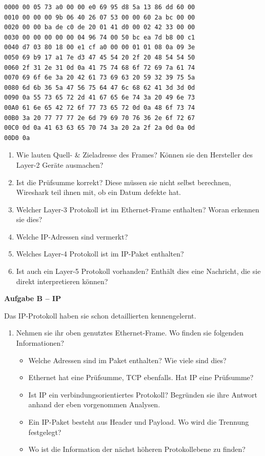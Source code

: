 \documentclass[paper=a4,fontsize=11pt]{scrartcl}%
\begin{document}
\begin{enumerate}
		\begin{lstlisting}[style=Bash, language=Bash]
0000 00 05 73 a0 00 00 e0 69 95 d8 5a 13 86 dd 60 00
0010 00 00 00 9b 06 40 26 07 53 00 00 60 2a bc 00 00
0020 00 00 ba de c0 de 20 01 41 d0 00 02 42 33 00 00
0030 00 00 00 00 00 04 96 74 00 50 bc ea 7d b8 00 c1
0040 d7 03 80 18 00 e1 cf a0 00 00 01 01 08 0a 09 3e
0050 69 b9 17 a1 7e d3 47 45 54 20 2f 20 48 54 54 50
0060 2f 31 2e 31 0d 0a 41 75 74 68 6f 72 69 7a 61 74
0070 69 6f 6e 3a 20 42 61 73 69 63 20 59 32 39 75 5a
0080 6d 6b 36 5a 47 56 75 64 47 6c 68 62 41 3d 3d 0d
0090 0a 55 73 65 72 2d 41 67 65 6e 74 3a 20 49 6e 73
00A0 61 6e 65 42 72 6f 77 73 65 72 0d 0a 48 6f 73 74
00B0 3a 20 77 77 77 2e 6d 79 69 70 76 36 2e 6f 72 67
00C0 0d 0a 41 63 63 65 70 74 3a 20 2a 2f 2a 0d 0a 0d
00D0 0a 
	\end{lstlisting}
	\begin{enumerate}
		\item Wie lauten Quell- \& Zieladresse des Frames? Können sie den Hersteller des Layer-2 Geräte ausmachen?
		\item Ist die Prüfsumme korrekt? Diese müssen sie nicht selbst berechnen, Wireshark teil ihnen mit, ob ein Datum defekte hat.
		\item Welcher Layer-3 Protokoll ist im Ethernet-Frame enthalten? Woran erkennen sie dies?
		\item Welche IP-Adressen sind vermerkt?
		\item Welches Layer-4 Protokoll ist im IP-Paket enthalten?
		\item Ist auch ein Layer-5 Protokoll vorhanden? Enthält dies eine Nachricht, die sie direkt interpretieren können?
	\end{enumerate}
\end{enumerate}

\begin{center}\Large{\textbf{Aufgabe B -- IP}}\end{center}\vskip0.2in
Das IP-Protokoll haben sie schon detaillierten kennengelernt.
\begin{enumerate}
	\item Nehmen sie ihr oben genutztes Ethernet-Frame. Wo finden sie folgenden Informationen?
	\begin{itemize}
		\item Welche Adressen sind im Paket enthalten? Wie viele sind dies?
		\item Ethernet hat eine Prüfsumme, TCP ebenfalls. Hat IP eine Prüfsumme?
		\item Ist IP ein verbindungsorientiertes Protokoll? Begründen sie ihre Antwort anhand der eben vorgenommen Analysen.
		\item Ein IP-Paket besteht aus Header und Payload. Wo wird die Trennung festgelegt?
		\item Wo ist die Information der nächst höheren Protokollebene zu finden? 
	\end{itemize}
\end{enumerate} 
\end{document}

